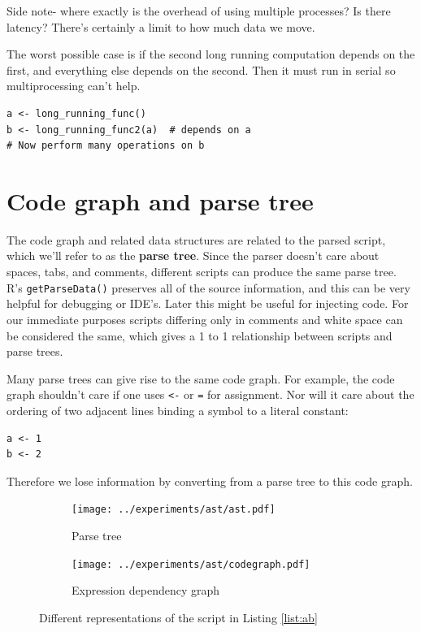 \documentclass[12pt]{article}
\begin{document}
Side note- where exactly is the overhead of using multiple processes? Is
there latency? There's certainly a limit to how much data we move.

The worst possible case is if the second long running computation depends
on the first, and everything else depends on the second. Then it must run
in serial so multiprocessing can't help.

\begin{verbatim}
a <- long_running_func()
b <- long_running_func2(a)  # depends on a
# Now perform many operations on b
\end{verbatim}

\section{Code graph and parse tree }

The code graph and related data structures are related to the parsed
script, which we'll refer to as the \textbf{parse tree}. Since the parser
doesn't care about spaces, tabs, and comments,  different scripts can produce the same parse
tree. R's \texttt{getParseData()} preserves all of the source
information, and this can be very helpful for debugging or IDE's. Later
this might be useful for injecting code.
For our immediate purposes scripts differing only in comments and white space can be
considered the same, which gives a 1 to 1 relationship between scripts and
parse trees. 

Many parse trees can give rise to the same code graph. For
example, the code graph shouldn't care if one uses \texttt{<-} or
\texttt{=} for assignment. Nor will it care about the ordering of two
adjacent lines binding a symbol to a literal constant:

\begin{verbatim}
a <- 1
b <- 2
\end{verbatim}

Therefore we lose information by converting from a parse tree to this code
graph.



\begin{figure}
\centering
\begin{subfigure}{.6\textwidth}
    \centering
    \texttt{[image: ../experiments/ast/ast.pdf]}
    \caption{Parse tree}
    \label{fig:ast}
\end{subfigure}%
\begin{subfigure}{.4\textwidth}
  \centering
  \texttt{[image: ../experiments/ast/codegraph.pdf]}
  \caption{Expression dependency graph}
  \label{fig:codegraph}
\end{subfigure}
\caption{Different representations of the script in Listing \ref{list:ab}}
\end{figure}
\end{document}
